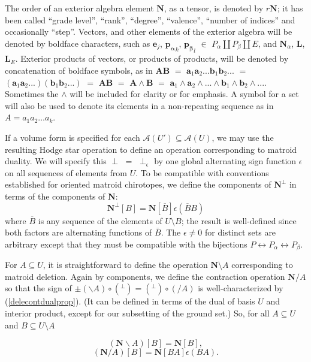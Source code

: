 \documentclass[Unicode]{cedram-alco}
\newcommand{\ext}[1]{\ensuremath{\mathbf{#1}}}
\newcommand{\dunion}{\coprod}
\begin{document}
The order of an exterior algebra element $\ext{N}$, as a tensor,
is denoted by $r\ext{N}$; it has been 
called ``grade level'', ``rank'', ``degree'',
``valence'', ``number of indices''
and occasionally\cite{RotaCayley} ``step''.
Vectors, and other elements of the
exterior algebra will be denoted by boldface
characters, such as $\ext{e}_j$, $\ext{p_\alpha}_k$,
$\ext{p_\beta}_l$ $\in$ $P_\alpha \dunion P_\beta \dunion E$,
and $\ext{N}_\alpha$, $\ext{L}$, $\ext{L}_E$.  Exterior products
of vectors, or products of products, will be denoted by
concatenation of boldface symbols, as in $\ext{AB}$
 $=$ $\ext{a}_1\ext{a}_2...\ext{b}_1\ext{b}_2...$ $=$
$(\ext{a}_1\ext{a}_2...)(\ext{b}_1\ext{b}_2...)$ $=$
$\ext{A}\ext{B}$ $=$ $\ext{A}\wedge\ext{B}$ $=$ 
$\ext{a}_1\wedge\ext{a}_2\wedge...\wedge\ext{b}_1\wedge\ext{b}_2\wedge...$.
Sometimes the $\wedge$ will be included for clarity or for emphasis.
A symbol for a set will also be used to denote its elements
in a non-repeating sequence as in $A=a_1a_2\ldots a_k$.



If a volume form is specified for each $\mathcal{A}(U')\subseteq\mathcal{A}(U)$,
we may use the resulting Hodge star operation to define an operation
corresponding to matroid duality.  We will specify this
$\perp$ $=$ $\perp_\epsilon$ by one global
alternating sign function $\epsilon$  on all sequences of
elements from $U$.  To be compatible with conventions established
for oriented matroid chirotopes\cite{OMBOOK}, we define 
the components of $\ext{N}^\perp$ in terms of the
components of $\ext{N}$:
\begin{equation}\label{dualdefinition}
  \ext{N}^\perp[B] = \ext{N}[\overline{B}]\epsilon(\overline{B}B)
\end{equation}
where $\overline{B}$ is any sequence of the elements of $U\setminus B$;
the result is well-defined since both factors are alternating
functions of $\overline{B}$.  The $\epsilon\neq 0$ for distinct sets
are arbitrary except that they must be compatible with
the bijections
$P \leftrightarrow P_{\alpha}\leftrightarrow P_{\beta}$.

For $A\subseteq U$, it is straightforward to
define the operation $\ext{N}\setminus A$ corresponding to matroid
deletion.  Again by components, we define the 
contraction operation $\ext{N}/A$
so that the sign of $\pm(\backslash A)\circ(^\perp)=(^\perp)\circ(/ A)$
is well-characterized by (\ref{delecontdualprop}).  (It can be
defined in terms
of the dual of basis $U$ and interior product\cite{MarcusFDMuAlPt2},
except for our
subsetting of the ground set.) So, for all $A\subseteq U$ and
$B\subseteq U \setminus A$
\begin{defi}\label{extmatdefs}
  \begin{equation}\label{deletion-definition}
  (\ext{N}\backslash A)[B] = \ext{N}[B],
\end{equation}
\begin{equation}\label{contraction-definition}
  (\ext{N}/A)[B] = \ext{N}[BA]\epsilon(BA).
\end{equation}
\end{defi}
\end{document}
